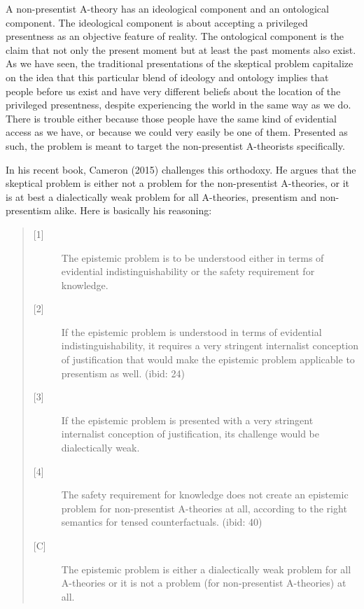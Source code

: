 \documentclass[a4paper,12pt]{article}
\begin{document}
A non-presentist A-theory has an ideological component and an ontological component. The ideological component is about accepting a privileged presentness as an objective feature of reality. The ontological component is the claim that not only the present moment but at least the past moments also exist. As we have seen, the traditional presentations of the skeptical problem capitalize on the idea that this particular blend of ideology and ontology implies that people before us exist and have very different beliefs about the location of the privileged presentness, despite experiencing the world in the same way as we do. There is trouble either because those people have the same kind of evidential access as we have, or because we could very easily be one of them. Presented as such, the problem is meant to target the non-presentist A-theorists specifically.

In his recent book, Cameron (2015) challenges this orthodoxy. He argues that the skeptical problem is either not a problem for the non-presentist A-theories, or it is at best a dialectically weak problem for all A-theories, presentism and non-presentism alike. Here is basically his reasoning:

\begin{quote}
\begin{description}
\item[{[1]}] The epistemic problem is to be understood either in terms of evidential indistinguishability or the safety requirement for knowledge.
\item[{[2]}] If the epistemic problem is understood in terms of evidential indistinguishability, it requires a very stringent internalist conception of justification that would make the epistemic problem applicable to presentism as well. (ibid: 24)
\item[{[3]}] If the epistemic problem is presented with a very stringent internalist conception of justification, its challenge would be dialectically weak.
\item[{[4]}] The safety requirement for knowledge does not create an epistemic problem for non-presentist A-theories at all, according to the right semantics for tensed counterfactuals. (ibid: 40)
\item[{[C]}] The epistemic problem is either a dialectically weak problem for all A-theories or it is not a problem (for non-presentist A-theories) at all.
\end{description}
\end{quote}
\end{document}

